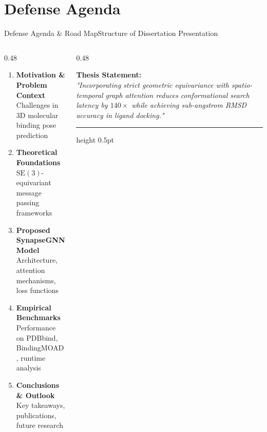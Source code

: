 \documentclass[10pt,aspectratio=169]{beamer}
\begin{document}
\section{Defense Agenda}
\begin{frame}{Defense Agenda \& Road Map}{Structure of Dissertation Presentation}
  \begin{columns}[T]
    \begin{column}{0.48\textwidth}
      \begin{tcolorbox}[defensebox,title={\faList \quad Presentation Overview}]
        \begin{enumerate}
          \setlength{\itemsep}{4pt}
          \item \textbf{\color{NavyDark}Motivation \& Problem Context}
                \\{\tiny Challenges in 3D molecular binding pose prediction}
          \item \textbf{\color{NavyDark}Theoretical Foundations}
                \\{\tiny $\mathrm{SE}(3)$-equivariant message passing frameworks}
          \item \textbf{\color{NavyDark}Proposed SynapseGNN Model}
                \\{\tiny Architecture, attention mechanisms, loss functions}
          \item \textbf{\color{NavyDark}Empirical Benchmarks}
                \\{\tiny Performance on PDBbind, BindingMOAD, runtime analysis}
          \item \textbf{\color{NavyDark}Conclusions \& Outlook}
                \\{\tiny Key takeaways, publications, future research}
        \end{enumerate}
      \end{tcolorbox}
    \end{column}
    
    \begin{column}{0.48\textwidth}
      \begin{tcolorbox}[highlightbox,title={\faLightbulb \quad Core Thesis Contribution}]
        \small
        \textbf{Thesis Statement:} \\
        \textit{"Incorporating strict geometric equivariance with spatio-temporal graph attention reduces conformational search latency by $140\times$ while achieving sub-angstrom RMSD accuracy in ligand docking."}
        
        \vspace{6pt}
        \hrule height 0.5pt \color{CardBorder}
        \vspace{4pt}
        

\end{tcolorbox}
\end{column}
\end{columns}
\end{frame}
\end{document}
